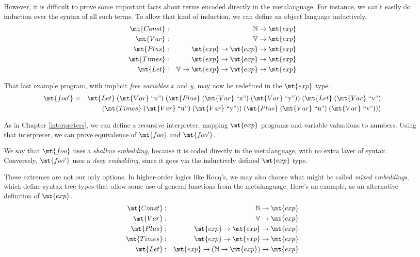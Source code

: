 \documentclass{amsbook}
\theoremstyle{definition}
\theoremstyle{remark}
\numberwithin{section}{chapter}
\numberwithin{equation}{chapter}
\begin{document}
However, it is difficult to prove some important facts about terms encoded directly in the metalanguage.
For instance, we can't easily do induction over the syntax of all such terms.
To allow that kind of induction, we can define an object language inductively.
\encoding
\begin{eqnarray*}
  \mt{Const} &:& \mathbb N \to \mt{exp} \\
  \mt{Var} &:& \mathbb V \to \mt{exp} \\
  \mt{Plus} &:& \mt{exp} \to \mt{exp} \to \mt{exp} \\
  \mt{Times} &:& \mt{exp} \to \mt{exp} \to \mt{exp} \\
  \mt{Let} &:& \mathbb V \to \mt{exp} \to \mt{exp} \to \mt{exp}
\end{eqnarray*}

That last example program, with implicit \emph{free variables} $x$ and $y$, may now be redefined in the $\mt{exp}$ type.
\newcommand{\var}[1]{\mt{Var} \; \textrm{``#1''}}
\begin{eqnarray*}
  \mt{foo'} &=& \mt{Let} \; (\var{u}) \; (\mt{Plus} \; (\var{x}) \; (\var{y})) \; (\mt{Let} \; (\var{v}) \\
  && \hspace{.1in} (\mt{Times} \; (\var{u}) \; (\var{y})) \; (\mt{Plus} \; (\var{u}) \; (\var{v})))
\end{eqnarray*}

As in Chapter \ref{interpreters}, we can define a recursive interpreter, mapping $\mt{exp}$ programs and variable valuations to numbers.
Using that interpreter, we can prove equivalence of $\mt{foo}$ and $\mt{foo'}$.

We say that $\mt{foo}$ uses a \emph{shallow embedding}, because it is coded directly in the metalanguage, with no extra layer of syntax.
Conversely, $\mt{foo'}$ uses a \emph{deep embedding}, since it goes via the inductively defined $\mt{exp}$ type.

These extremes are not our only options.
In higher-order logics like Rocq's, we may also choose what might be called \emph{mixed embeddings}, which define syntax-tree types that allow some use of general functions from the metalanguage.
Here's an example, as an alternative definition of $\mt{exp}$.
\encoding
\begin{eqnarray*}
  \mt{Const} &:& \mathbb N \to \mt{exp} \\
  \mt{Var} &:& \mathbb V \to \mt{exp} \\
  \mt{Plus} &:& \mt{exp} \to \mt{exp} \to \mt{exp} \\
  \mt{Times} &:& \mt{exp} \to \mt{exp} \to \mt{exp} \\
  \mt{Let} &:& \mt{exp} \to (\mathbb N \to \mt{exp}) \to \mt{exp}
\end{eqnarray*}
\end{document}
